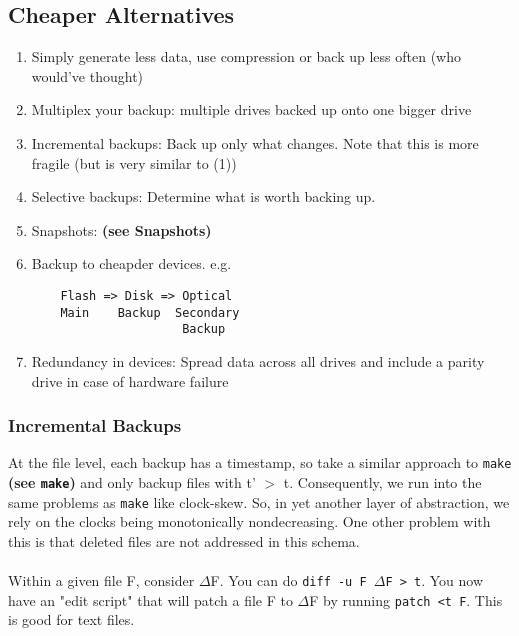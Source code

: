 \documentclass[13pt]{article}
\begin{document}
\subsection{Cheaper Alternatives}
\begin{enumerate}[label=(\arabic*)]
\item Simply generate less data, use compression or back up less often (who would've thought)
\item Multiplex your backup: multiple drives backed up onto one bigger drive
\item Incremental backups: Back up only what changes. Note that this is more fragile (but is very similar to (1))
\item Selective backups: Determine what is worth backing up.
\item Snapshots: \textbf{(see Snapshots)}
\item Backup to cheapder devices. e.g.
\begin{verbatim}
    Flash => Disk => Optical
    Main    Backup  Secondary
                     Backup
\end{verbatim}
\item Redundancy in devices: Spread data across all drives and include a parity drive in case of hardware failure
\end{enumerate}

\subsubsection{Incremental Backups}
At the file level, each backup has a timestamp, so take a similar approach to \texttt{make} \textbf{(see \texttt{make})} and only backup files with t' $>$ t. Consequently, we run into the same problems as \texttt{make} like clock-skew. So, in yet another layer of abstraction, we rely on the clocks being monotonically nondecreasing. One other problem with this is that deleted files are not addressed in this schema. \\ \\
Within a given file F, consider $\Delta$F. You can do \texttt{diff -u F $\Delta$F > t}. You now have an "edit script" that will patch a file F to $\Delta$F by running \texttt{patch <t F}. This is good for text files.
\end{document}

